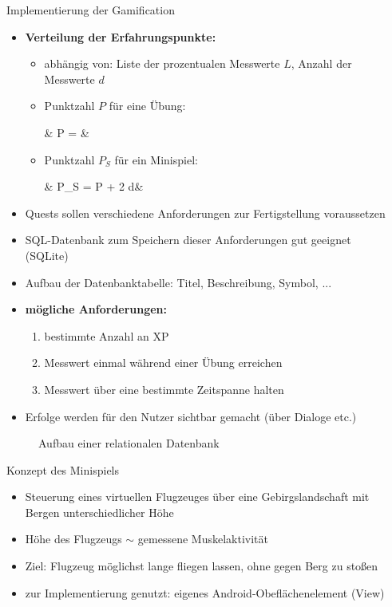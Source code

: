 \documentclass[final,20pt]{beamer}
\newlength{\sepwidth}
\newlength{\colwidth}
\newcommand{\separatorcolumn}{\begin{column}{\sepwidth}\end{column}}
\begin{document}
\begin{frame}[t]
\begin{columns}[t]
\begin{column}{\colwidth}
	\begin{alertblock}{Implementierung der Gamification}
		\begin{itemize}
			\item \textbf{Verteilung der Erfahrungspunkte:}
			\begin{itemize}
				\item abhängig von: Liste der prozentualen Messwerte $L$, Anzahl der Messwerte $d$
				\item Punktzahl $P$ für eine Übung:
				\begin{flalign*}
				& P = &
				\end{flalign*}
				\item Punktzahl $P_{S}$ für ein Minispiel:
				\begin{flalign*}
				& P_{S} = P + 2 \cdot d&
				\end{flalign*}
			\end{itemize}
			\item Quests sollen verschiedene Anforderungen zur Fertigstellung voraussetzen
			\item SQL-Datenbank zum Speichern dieser Anforderungen gut geeignet (SQLite)
			\item Aufbau der Datenbanktabelle: Titel, Beschreibung, Symbol, ...
			\item \textbf{mögliche Anforderungen:}
			\begin{enumerate}
				\item bestimmte Anzahl an XP
				\item Messwert einmal während einer Übung erreichen
				\item Messwert über eine bestimmte Zeitspanne halten
			\end{enumerate}
			\item Erfolge werden für den Nutzer sichtbar gemacht (über Dialoge etc.)
		\end{itemize}
		\begin{figure}[H]
			\centering
			
			\caption{Aufbau einer relationalen Datenbank}
		\end{figure}
	\end{alertblock}

	\begin{alertblock}{Konzept des Minispiels}
		\begin{itemize}
			\item Steuerung eines virtuellen Flugzeuges über eine Gebirgslandschaft mit Bergen unterschiedlicher Höhe
			\item Höhe des Flugzeugs $\sim$ gemessene Muskelaktivität
			\item Ziel: Flugzeug möglichst lange fliegen lassen, ohne gegen Berg zu stoßen
			\item zur Implementierung genutzt: eigenes Android-Obeflächenelement (View)
		\end{itemize}
	\end{alertblock}

\end{column}

\separatorcolumn
\end{columns}
\end{frame}
\end{document}

